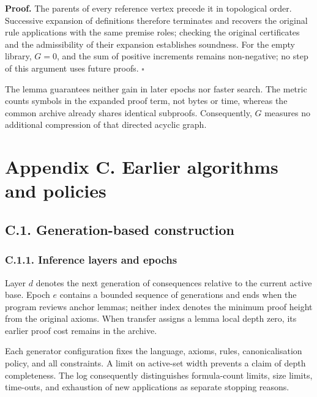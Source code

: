 \documentclass[pdflatex,sn-basic,Numbered]{sn-jnl}
\begin{document}
\textbf{Proof.} The parents of every reference vertex precede it in topological order. Successive expansion of definitions therefore terminates and recovers the original rule applications with the same premise roles; checking the original certificates and the admissibility of their expansion establishes soundness. For the empty library, \(G = 0\), and the sum of positive increments remains non-negative; no step of this argument uses future proofs. \(\square\)

The lemma guarantees neither gain in later epochs nor faster search. The metric counts symbols in the expanded proof term, not bytes or time, whereas the common archive already shares identical subproofs. Consequently, \(G\) measures no additional compression of that directed acyclic graph.

\section*{Appendix C. Earlier algorithms and policies}\label{appendix-c.-earlier-algorithms-and-policies}

\subsection*{C.1. Generation-based construction}\label{c.1.-generation-based-construction}

\subsubsection*{C.1.1. Inference layers and epochs}\label{c.1.1.-inference-layers-and-epochs}

Layer \(d\) denotes the next generation of consequences relative to the current active base. Epoch \(e\) contains a bounded sequence of generations and ends when the program reviews anchor lemmas; neither index denotes the minimum proof height from the original axioms. When transfer assigns a lemma local depth zero, its earlier proof cost remains in the archive.

Each generator configuration fixes the language, axioms, rules, canonicalisation policy, and all constraints. A limit on active-set width prevents a claim of depth completeness. The log consequently distinguishes formula-count limits, size limits, time-outs, and exhaustion of new applications as separate stopping reasons.
\end{document}
